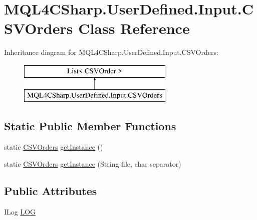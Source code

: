 \hypertarget{class_m_q_l4_c_sharp_1_1_user_defined_1_1_input_1_1_c_s_v_orders}{}\section{M\+Q\+L4\+C\+Sharp.\+User\+Defined.\+Input.\+C\+S\+V\+Orders Class Reference}
\label{class_m_q_l4_c_sharp_1_1_user_defined_1_1_input_1_1_c_s_v_orders}
Inheritance diagram for M\+Q\+L4\+C\+Sharp.\+User\+Defined.\+Input.\+C\+S\+V\+Orders\+:\begin{figure}[H]
\begin{center}
\leavevmode
\includegraphics[height=2.000000cm]{class_m_q_l4_c_sharp_1_1_user_defined_1_1_input_1_1_c_s_v_orders}
\end{center}
\end{figure}
\subsection*{Static Public Member Functions}
\begin{DoxyCompactItemize}
\item 
static \hyperlink{class_m_q_l4_c_sharp_1_1_user_defined_1_1_input_1_1_c_s_v_orders}{C\+S\+V\+Orders} \hyperlink{class_m_q_l4_c_sharp_1_1_user_defined_1_1_input_1_1_c_s_v_orders_a85db25c1c70c91bb42799cea04e69707}{get\+Instance} ()
\item 
static \hyperlink{class_m_q_l4_c_sharp_1_1_user_defined_1_1_input_1_1_c_s_v_orders}{C\+S\+V\+Orders} \hyperlink{class_m_q_l4_c_sharp_1_1_user_defined_1_1_input_1_1_c_s_v_orders_a7437425521ac4a0882c3d3ac0a64ff5d}{get\+Instance} (String file, char separator)
\end{DoxyCompactItemize}
\subsection*{Public Attributes}
\begin{DoxyCompactItemize}
\item 
I\+Log \hyperlink{class_m_q_l4_c_sharp_1_1_user_defined_1_1_input_1_1_c_s_v_orders_af84073f59357207076d6ea95eb84e27e}{L\+OG}
\end{DoxyCompactItemize}
